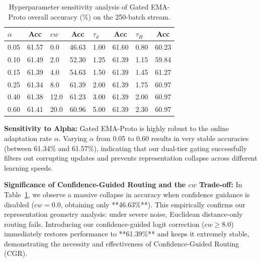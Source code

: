 \documentclass{article}
\theoremstyle{plain}
\theoremstyle{definition}
\theoremstyle{remark}
\begin{document}
\begin{table}[t]
\caption{Hyperparameter sensitivity analysis of Gated EMA-Proto overall accuracy (\%) on the 250-batch stream.}
\label{tab:sensitivity}
\vskip 0.1in
\begin{center}
\begin{small}
\begin{sc}
\setlength{\tabcolsep}{1.2pt}
\begin{tabular}{lc|lc|lc|lc}
\toprule
$\alpha$ & Acc & $cw$ & Acc & $\tau_d$ & Acc & $\tau_H$ & Acc \\
\midrule
0.05 & 61.57 & 0.0 & 46.63 & 1.00 & 61.60 & 0.80 & 60.23 \\
0.10 & 61.49 & 2.0 & 52.30 & 1.25 & 61.39 & 1.15 & 59.84 \\
0.15 & 61.39 & 4.0 & 54.63 & 1.50 & 61.39 & 1.45 & 61.27 \\
0.25 & 61.34 & 8.0 & 61.39 & 2.00 & 61.39 & 1.75 & 60.97 \\
0.40 & 61.38 & 12.0 & 61.23 & 3.00 & 61.39 & 2.00 & 60.97 \\
0.60 & 61.41 & 20.0 & 60.96 & 5.00 & 61.39 & 2.30 & 60.97 \\
\bottomrule
\end{tabular}
\end{sc}
\end{small}
\end{center}
\end{table}

\textbf{Sensitivity to Alpha:} Gated EMA-Proto is highly robust to the online adaptation rate $\alpha$. Varying $\alpha$ from 0.05 to 0.60 results in very stable accuracies (between 61.34\% and 61.57\%), indicating that our dual-tier gating successfully filters out corrupting updates and prevents representation collapse across different learning speeds.

\textbf{Significance of Confidence-Guided Routing and the $cw$ Trade-off:} In Table~\ref{tab:sensitivity}, we observe a massive collapse in accuracy when confidence guidance is disabled ($cw=0.0$, obtaining only **46.63\%**). This empirically confirms our representation geometry analysis: under severe noise, Euclidean distance-only routing fails. Introducing our confidence-guided logit correction ($cw \ge 8.0$) immediately restores performance to **61.39\%** and keeps it extremely stable, demonstrating the necessity and effectiveness of Confidence-Guided Routing (CGR). 
\end{document}
